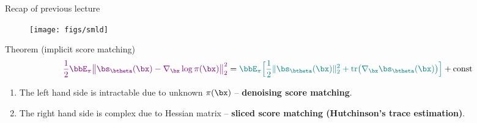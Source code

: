 

\usepackage{tikz}

\usetikzlibrary{arrows,shapes,positioning,shadows,trees}

\begin{frame}
\titlepage
\end{frame}
\begin{frame}{Recap of previous lecture}
	\begin{figure}
		\centering
		\texttt{[image: figs/smld]}
	\end{figure}
	\vspace{-0.3cm} 
	\begin{block}{Theorem (implicit score matching)}
		\vspace{-0.6cm}
		\[
		{\color{violet}\frac{1}{2} \bbE_{\pi}\bigl\| \bs_{\btheta}(\bx) - \nabla_\bx \log \pi(\bx) \bigr\|^2_2} = {\color{teal}\bbE_{\pi}\Bigr[ \frac{1}{2}\| \bs_{\btheta}(\bx) \|_2^2 + \text{tr}\bigl(\nabla_{\bx} \bs_{\btheta}(\bx)\bigr) \Bigr]} + \text{const}
		\]
	\end{block}
	\vspace{-0.5cm}
	\begin{enumerate}
		\item {\color{violet}The left hand side} is intractable due to unknown $\pi(\bx)$ -- \textbf{denoising score matching}. 
		\item {\color{teal}The right hand side} is complex due to Hessian matrix -- \textbf{sliced score matching (Hutchinson's trace estimation)}.
	\end{enumerate}
\end{frame}
